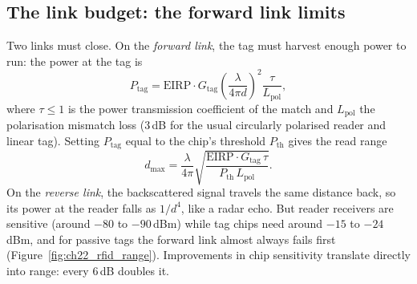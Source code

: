 
\subsection{The link budget: the forward link limits}

Two links must close. On the \emph{forward link}, the tag must harvest enough power to run: the power
at the tag is
\begin{equation}
P_{\text{tag}}=\text{EIRP}\cdot G_{\text{tag}}\left(\frac{\lambda}{4\pi d}\right)^{2}\frac{\tau}{L_{\text{pol}}},
\label{eq:ch22:rfidfwd}
\end{equation}
where $\tau\le1$ is the power transmission coefficient of the match and $L_{\text{pol}}$ the
polarisation mismatch loss (3\,dB for the usual circularly polarised reader and linear tag). Setting
$P_{\text{tag}}$ equal to the chip's threshold $P_{\text{th}}$ gives the read range
\begin{equation}
d_{\max}=\frac{\lambda}{4\pi}\sqrt{\frac{\text{EIRP}\cdot G_{\text{tag}}\,\tau}{P_{\text{th}}\,L_{\text{pol}}}}.
\label{eq:ch22:rfidrange}
\end{equation}
On the \emph{reverse link}, the backscattered signal travels the same distance back, so its power at
the reader falls as $1/d^4$, like a radar echo. But reader receivers are sensitive (around $-80$ to
$-90$\,dBm) while tag chips need around $-15$ to $-24$\,dBm, and for passive tags the forward link
almost always fails first (Figure~\ref{fig:ch22_rfid_range}). Improvements in chip sensitivity
translate directly into range: every 6\,dB doubles it.

